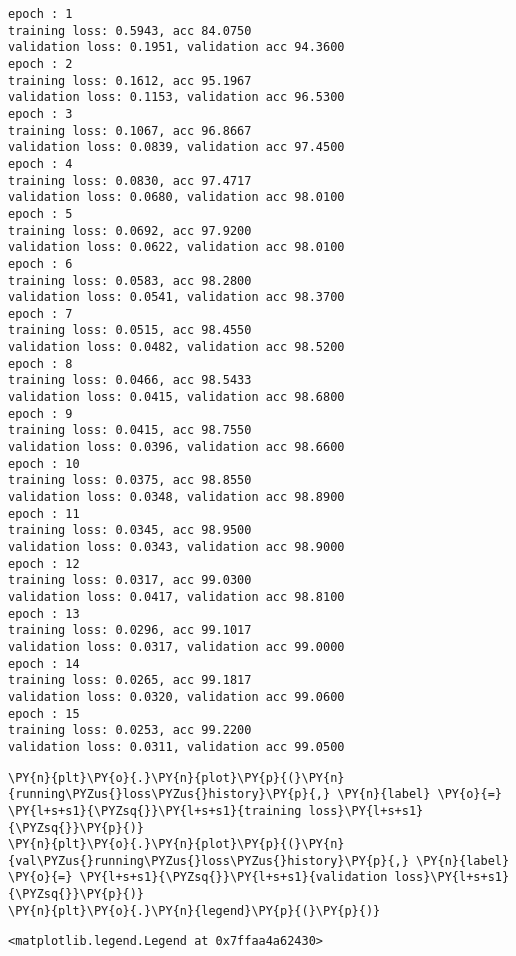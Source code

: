     \begin{Verbatim}[commandchars=\\\{\}]
epoch : 1
training loss: 0.5943, acc 84.0750
validation loss: 0.1951, validation acc 94.3600
epoch : 2
training loss: 0.1612, acc 95.1967
validation loss: 0.1153, validation acc 96.5300
epoch : 3
training loss: 0.1067, acc 96.8667
validation loss: 0.0839, validation acc 97.4500
epoch : 4
training loss: 0.0830, acc 97.4717
validation loss: 0.0680, validation acc 98.0100
epoch : 5
training loss: 0.0692, acc 97.9200
validation loss: 0.0622, validation acc 98.0100
epoch : 6
training loss: 0.0583, acc 98.2800
validation loss: 0.0541, validation acc 98.3700
epoch : 7
training loss: 0.0515, acc 98.4550
validation loss: 0.0482, validation acc 98.5200
epoch : 8
training loss: 0.0466, acc 98.5433
validation loss: 0.0415, validation acc 98.6800
epoch : 9
training loss: 0.0415, acc 98.7550
validation loss: 0.0396, validation acc 98.6600
epoch : 10
training loss: 0.0375, acc 98.8550
validation loss: 0.0348, validation acc 98.8900
epoch : 11
training loss: 0.0345, acc 98.9500
validation loss: 0.0343, validation acc 98.9000
epoch : 12
training loss: 0.0317, acc 99.0300
validation loss: 0.0417, validation acc 98.8100
epoch : 13
training loss: 0.0296, acc 99.1017
validation loss: 0.0317, validation acc 99.0000
epoch : 14
training loss: 0.0265, acc 99.1817
validation loss: 0.0320, validation acc 99.0600
epoch : 15
training loss: 0.0253, acc 99.2200
validation loss: 0.0311, validation acc 99.0500
    \end{Verbatim}

    \begin{tcolorbox}[breakable, size=fbox, boxrule=1pt, pad at break*=1mm,colback=cellbackground, colframe=cellborder]
\begin{Verbatim}[commandchars=\\\{\}]
\PY{n}{plt}\PY{o}{.}\PY{n}{plot}\PY{p}{(}\PY{n}{running\PYZus{}loss\PYZus{}history}\PY{p}{,} \PY{n}{label} \PY{o}{=} \PY{l+s+s1}{\PYZsq{}}\PY{l+s+s1}{training loss}\PY{l+s+s1}{\PYZsq{}}\PY{p}{)}
\PY{n}{plt}\PY{o}{.}\PY{n}{plot}\PY{p}{(}\PY{n}{val\PYZus{}running\PYZus{}loss\PYZus{}history}\PY{p}{,} \PY{n}{label} \PY{o}{=} \PY{l+s+s1}{\PYZsq{}}\PY{l+s+s1}{validation loss}\PY{l+s+s1}{\PYZsq{}}\PY{p}{)}
\PY{n}{plt}\PY{o}{.}\PY{n}{legend}\PY{p}{(}\PY{p}{)}
\end{Verbatim}
\end{tcolorbox}

            \begin{tcolorbox}[breakable, size=fbox, boxrule=.5pt, pad at break*=1mm, opacityfill=0]
\begin{Verbatim}[commandchars=\\\{\}]
<matplotlib.legend.Legend at 0x7ffaa4a62430>
\end{Verbatim}
\end{tcolorbox}
        
